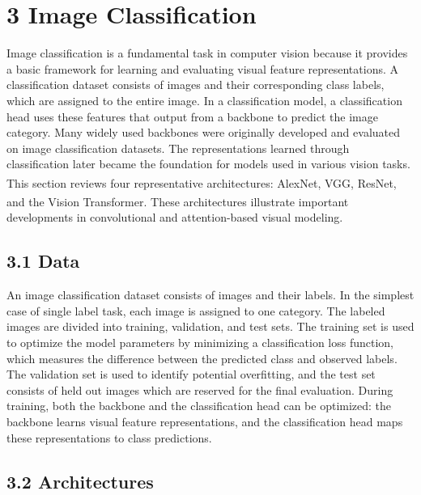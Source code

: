 \documentclass[
  letterpaper,
  DIV=11,
  numbers=noendperiod]{scrartcl}
\begin{document}
\section{3 Image Classification}\label{image-classification}

Image classification is a fundamental task in computer vision because it
provides a basic framework for learning and evaluating visual feature
representations. A classification dataset consists of images and their
corresponding class labels, which are assigned to the entire image. In a
classification model, a classification head uses these features that
output from a backbone to predict the image category. Many widely used
backbones were originally developed and evaluated on image
classification datasets. The representations learned through
classification later became the foundation for models used in various
vision tasks. This section reviews four representative architectures:
AlexNet\textsuperscript{},
VGG\textsuperscript{},
ResNet\textsuperscript{}, and the Vision
Transformer\textsuperscript{}. These architectures
illustrate important developments in convolutional and attention-based
visual modeling.

\subsection{3.1 Data}\label{data}

An image classification dataset consists of images and their labels. In
the simplest case of single label task, each image is assigned to one
category. The labeled images are divided into training, validation, and
test sets. The training set is used to optimize the model parameters by
minimizing a classification loss function, which measures the difference
between the predicted class and observed labels. The validation set is
used to identify potential overfitting, and the test set consists of
held out images which are reserved for the final evaluation. During
training, both the backbone and the classification head can be
optimized: the backbone learns visual feature representations, and the
classification head maps these representations to class predictions.

\subsection{3.2 Architectures}\label{architectures}
\end{document}
